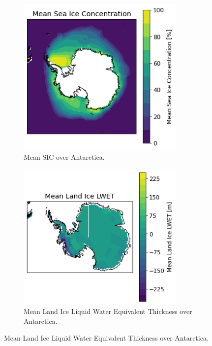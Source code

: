 \documentclass[../main.tex]{subfiles}
\begin{document}
\begin{figure}[H]
\centering
\begin{subfigure}[h!]{0.49\textwidth}
\includegraphics[width=0.9\textwidth]{images/week8/lres/mean_sic_distribution}
\caption{Mean SIC over Antarctica.}
\end{subfigure}
\begin{subfigure}[h!]{0.49\textwidth}
\includegraphics[width=0.9\textwidth]{images/week8/lres/mean_lic_distribution}
\caption{Mean Land Ice Liquid Water Equivalent Thickness over Antarctica.}
\end{subfigure}

\end{figure}
\end{document}
